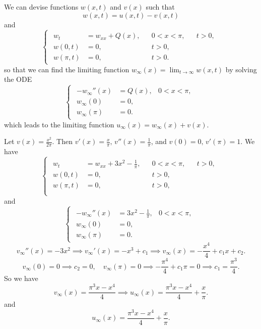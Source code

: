 \documentclass[plain]{pset}
\begin{document}
\begin{solution}
    We can devise functions \(w(x, t)\) and \(v(x)\) such that
    \[w(x, t) = u(x, t) - v(x, t)\]
    and
    \[
        \begin{cases}
            \begin{aligned}
                w_t       & = w_{xx} + Q(x), &  & 0 < x < \pi, &  & t > 0, \\
                w(0, t)   & = 0,             &  & t > 0,                   \\
                w(\pi, t) & = 0,             &  & t > 0.
            \end{aligned}
        \end{cases}
    \]
    so that we can find the limiting function \(w_\infty(x) = \lim_{t \to \infty} w(x, t)\) by solving the ODE
    \[
        \begin{cases}
            \begin{aligned}
                -w_\infty''(x) & = Q(x), & 0 < x < \pi, \\
                w_\infty(0)    & = 0,                   \\
                w_\infty(\pi)  & = 0.
            \end{aligned}
        \end{cases}
    \]
    which leads to the limiting function \(u_\infty(x) = w_\infty(x) + v(x)\).

    Let \(v(x) = \frac{x^2}{2\pi}\). Then \(v'(x) = \frac{x}{\pi}, \, v''(x) = \frac{1}{\pi}\), and \(v(0) = 0, \, v'(\pi) = 1\). We have
    \[
        \begin{cases}
            \begin{aligned}
                w_t         & = w_{xx} + 3x^2 - \frac{1}{\pi}, &  & 0 < x < \pi, &  & t > 0, \\
                w(0, t)     & = 0,                             &  & t > 0,                   \\
                w(\pi, t) & = 0,                             &  & t > 0,                   \\
            \end{aligned}
        \end{cases}
    \]
    and
    \[
        \begin{cases}
            \begin{aligned}
                -w_\infty''(x) & = 3x^2 - \frac{1}{\pi}, & 0 < x < \pi, \\
                w_\infty(0)    & = 0,                                   \\
                w_\infty(\pi)  & = 0.
            \end{aligned}
        \end{cases}
    \]
    \[v_\infty''(x) = -3x^2 \implies v_\infty'(x) = -x^3 + c_1 \implies v_\infty(x) = -\frac{x^4}{4} + c_1x + c_2.\]
    \[v_\infty(0) = 0 \implies c_2 = 0, \quad v_\infty(\pi) = 0 \implies -\frac{\pi^4}{4} + c_1\pi = 0 \implies c_1 = \frac{\pi^3}{4}.\]
    So we have
    \[v_\infty(x) = \frac{\pi^3 x - x^4}{4} \implies u_\infty(x) = \frac{\pi^3 x - x^4}{4} + \frac{x}{\pi}.\]
    and
    \[u_\infty(x) = \frac{\pi^3 x - x^4}{4} + \frac{x}{\pi}.\]
\end{solution}
\end{document}
